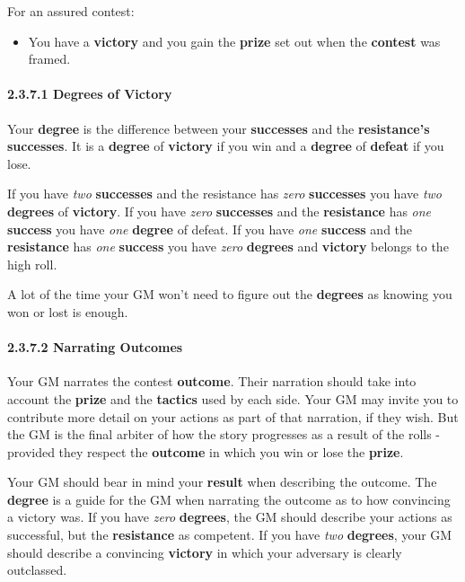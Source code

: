 \documentclass[
  11pt,
]{article}
\providecommand{\tightlist}{%
  \setlength{\itemsep}{0pt}\setlength{\parskip}{0pt}}
\begin{document}
For an assured contest:

\begin{itemize}
\tightlist
\item
  You have a \textbf{victory} and you gain the \textbf{prize} set out
  when the \textbf{contest} was framed.
\end{itemize}

\hypertarget{degrees-of-victory}{%
\paragraph{2.3.7.1 Degrees of Victory}\label{degrees-of-victory}}

Your \textbf{degree} is the difference between your \textbf{successes}
and the \textbf{resistance's} \textbf{successes}. It is a
\textbf{degree} of \textbf{victory} if you win and a \textbf{degree} of
\textbf{defeat} if you lose.

If you have \emph{two} \textbf{successes} and the resistance has
\emph{zero} \textbf{successes} you have \emph{two} \textbf{degrees} of
\textbf{victory}. If you have \emph{zero} \textbf{successes} and the
\textbf{resistance} has \emph{one} \textbf{success} you have \emph{one}
\textbf{degree} of defeat. If you have \emph{one} \textbf{success} and
the \textbf{resistance} has \emph{one} \textbf{success} you have
\emph{zero} \textbf{degrees} and \textbf{victory} belongs to the high
roll.

A lot of the time your GM won't need to figure out the \textbf{degrees}
as knowing you won or lost is enough.

\hypertarget{narrating-outcomes}{%
\paragraph{2.3.7.2 Narrating Outcomes}\label{narrating-outcomes}}

Your GM narrates the contest \textbf{outcome}. Their narration should
take into account the \textbf{prize} and the \textbf{tactics} used by
each side. Your GM may invite you to contribute more detail on your
actions as part of that narration, if they wish. But the GM is the final
arbiter of how the story progresses as a result of the rolls - provided
they respect the \textbf{outcome} in which you win or lose the
\textbf{prize}.

Your GM should bear in mind your \textbf{result} when describing the
outcome. The \textbf{degree} is a guide for the GM when narrating the
outcome as to how convincing a victory was. If you have \emph{zero}
\textbf{degrees}, the GM should describe your actions as successful, but
the \textbf{resistance} as competent. If you have \emph{two}
\textbf{degrees}, your GM should describe a convincing \textbf{victory}
in which your adversary is clearly outclassed.
\end{document}
